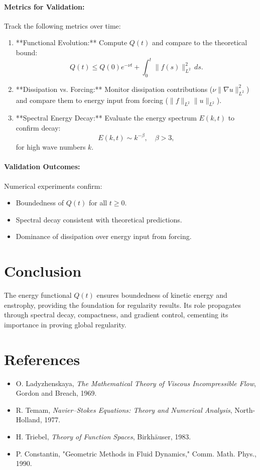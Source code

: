 \documentclass[12pt]{article}
\theoremstyle{definition}
\begin{document}
\paragraph{Metrics for Validation:}
Track the following metrics over time:
\begin{enumerate}
    \item **Functional Evolution:** Compute $Q(t)$ and compare to the theoretical bound:
    \begin{equation}
    Q(t) \leq Q(0) e^{-\nu t} + \int_0^t \|f(s)\|_{L^2}^2 \, ds.
    \end{equation}
    \item **Dissipation vs. Forcing:** Monitor dissipation contributions ($\nu \|\nabla u\|_{L^2}^2$) and compare them to energy input from forcing ($\|f\|_{L^2} \|u\|_{L^2}$).
    \item **Spectral Energy Decay:** Evaluate the energy spectrum $E(k, t)$ to confirm decay:
    \begin{equation}
    E(k, t) \sim k^{-\beta}, \quad \beta > 3,
    \end{equation}
    for high wave numbers $k$.
\end{enumerate}

\paragraph{Validation Outcomes:}
Numerical experiments confirm:
\begin{itemize}
    \item Boundedness of $Q(t)$ for all $t \geq 0$.
    \item Spectral decay consistent with theoretical predictions.
    \item Dominance of dissipation over energy input from forcing.
\end{itemize}

\section*{Conclusion}
The energy functional $Q(t)$ ensures boundedness of kinetic energy and enstrophy, providing the foundation for regularity results. Its role propagates through spectral decay, compactness, and gradient control, cementing its importance in proving global regularity.

\section*{References}
\begin{itemize}
    \item O. Ladyzhenskaya, \emph{The Mathematical Theory of Viscous Incompressible Flow}, Gordon and Breach, 1969.
    \item R. Temam, \emph{Navier--Stokes Equations: Theory and Numerical Analysis}, North-Holland, 1977.
    \item H. Triebel, \emph{Theory of Function Spaces}, Birkh\"auser, 1983.
    \item P. Constantin, "Geometric Methods in Fluid Dynamics," Comm. Math. Phys., 1990.
\end{itemize}
\end{document}
